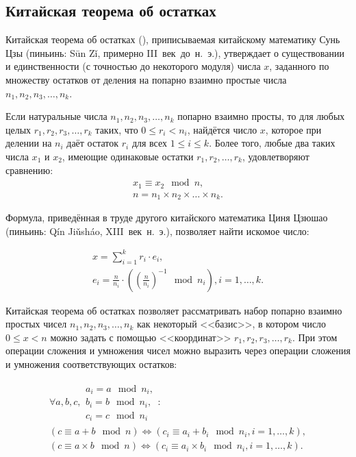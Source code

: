\subsection{Китайская теорема об остатках}\label{section-chinese-remainder-theorem}

Китайская теорема об остатках (), приписываемая китайскому математику Сунь Цзы (пиньинь: S\={u}n Z\v{i}, примерно III~век~до~н.~э.), утверждает о существовании и единственности (с точностью до некоторого модуля) числа $x$, заданного по множеству остатков от деления на попарно взаимно простые числа $n_1, n_2, n_3, \dots, n_k$.

\begin{theorem} Если натуральные числа $n_1, n_2, n_3, \dots, n_k$ попарно взаимно просты, то для любых целых $r_1, r_2, r_3, \dots, r_k$ таких, что $0 \leq r_i < n_i$, найдётся число $x$, которое при делении на $n_i$ даёт остаток $r_i$ для всех $1 \leq i \leq k$. Более того, любые два таких числа $x_1$ и $x_2$, имеющие одинаковые остатки $r_1, r_2, \dots, r_k$, удовлетворяют сравнению:
\[ \begin{array}{l}
	x_1 \equiv x_2 \mod n, \\
	n = n_1 \times n_2 \times \dots \times n_k.
\end{array} \]
\end{theorem}

Формула, приведённая в труде другого китайского математика Циня Цзюшао (пиньинь: Q\'{i}n Ji\v{u}sh\'{a}o, XIII~век~н.~э.), позволяет найти искомое число:

\[ \begin{array}{l}
	x = \sum\limits_{i=1}^k r_i \cdot e_i, \\
	e_i = \frac{n}{n_i} \cdot \left( \left(\frac{n}{n_i}\right)^{-1} \mod n_i \right), i = 1, \dots, k.
\end{array} \]

Китайская теорема об остатках позволяет рассматривать набор попарно взаимно простых чисел $n_1, n_2, n_3, \dots, n_k$ как некоторый <<базис>>, в котором число $0 \leq x < n$ можно задать с помощью <<координат>> $r_1, r_2, r_3, \dots, r_k$. При этом операции сложения и умножения чисел можно выразить через операции сложения и умножения соответствующих остатков:

\[ \begin{array}{l}
	\forall a, b, c, \begin{array}{l}
		a_i = a \mod n_i, \\
		b_i = b \mod n_i, \\
		c_i = c \mod n_i
	\end{array}: \\
	\left( c \equiv a + b \mod n \right) \Leftrightarrow \left( c_i \equiv a_i + b_i \mod n_i, i = 1, \dots, k \right), \\
	\left( c \equiv a \times b \mod n \right) \Leftrightarrow \left( c_i \equiv a_i \times b_i \mod n_i, i = 1, \dots, k \right).
\end{array} \]


